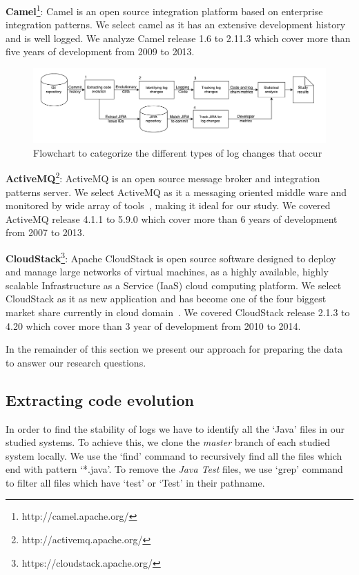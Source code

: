 \textbf{Camel}\footnote[2]{http://camel.apache.org/}: Camel is an open source integration platform based on enterprise integration patterns. We select camel as it has an extensive development history and is well logged. We analyze Camel release 1.6 to 2.11.3 which cover more than five years of development from 2009 to 2013. 
\begin{figure}[tb]
	\centering
	\includegraphics[width=1\linewidth,height=0.29\textwidth]{LogGenalogyMethdology}
	\caption{Flowchart to categorize the different types of log changes that occur}
	\label{fig:LGmethod}
\end{figure}



\textbf{ActiveMQ}\footnote[3]{http://activemq.apache.org/}: ActiveMQ is an open source message broker and integration patterns server. We select ActiveMQ as it a messaging oriented middle ware and monitored by wide array of tools~\cite{AMQm}, making it ideal for our study. We covered ActiveMQ release 4.1.1 to 5.9.0 which cover more than 6 years of development from 2007 to 2013.


\textbf{CloudStack}\footnote[4]{https://cloudstack.apache.org/}: Apache CloudStack is open source software designed to deploy and manage large networks of virtual machines, as a highly available, highly scalable Infrastructure as a Service (IaaS) cloud computing platform. We select CloudStack as it as new application and has become one of the four biggest market share currently in cloud domain~\cite{CloudStack}. We covered CloudStack release 2.1.3 to 4.20 which cover more than 3 year of development from 2010 to 2014.

In the remainder of this section we present our approach for preparing the data to answer
our research questions.


\subsection{Extracting code evolution}
In order to find the stability of logs we have to identify all the `Java' files in our studied systems. To achieve this, we clone the \emph{master} branch of each studied system locally. We use the `find' command to recursively find all the files which end with pattern `*.java'. To remove the \textsl{Java Test} files, we use `grep' command to filter all files which have `test' or `Test' in their pathname.

